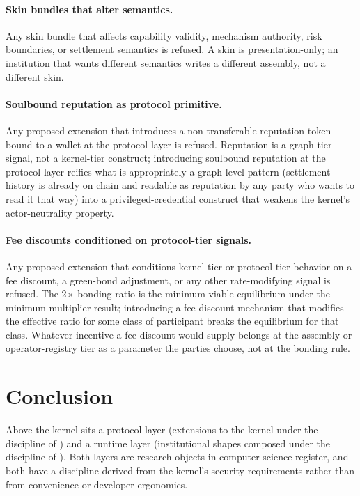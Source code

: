 \documentclass[11pt,a4paper]{article}
\theoremstyle{definition}
\theoremstyle{remark}
\begin{document}
\paragraph{Skin bundles that alter semantics.}
Any skin bundle that affects capability validity, mechanism
authority, risk boundaries, or settlement semantics is refused. A
skin is presentation-only; an institution that wants different
semantics writes a different assembly, not a different skin.

\paragraph{Soulbound reputation as protocol primitive.}
Any proposed extension that introduces a non-transferable
reputation token bound to a wallet at the protocol layer is
refused. Reputation is a graph-tier signal, not a kernel-tier
construct; introducing soulbound reputation at the protocol layer
reifies what is appropriately a graph-level pattern (settlement
history is already on chain and readable as reputation by any party
who wants to read it that way) into a privileged-credential
construct that weakens the kernel's actor-neutrality property.

\paragraph{Fee discounts conditioned on protocol-tier signals.}
Any proposed extension that conditions kernel-tier or
protocol-tier behavior on a fee discount, a green-bond
adjustment, or any other rate-modifying signal is refused. The
2$\times$ bonding ratio is the minimum viable equilibrium under
the minimum-multiplier result; introducing a fee-discount
mechanism that modifies the effective ratio for some class of
participant breaks the equilibrium for that class. Whatever
incentive a fee discount would supply belongs at the assembly
or operator-registry tier as a parameter the parties choose,
not at the bonding rule.

\section{Conclusion}
\label{sec:conclusion}

Above the kernel sits a protocol layer (extensions to the kernel
under the discipline of )
and a runtime layer (institutional shapes composed under the
discipline of ). Both layers are research objects
in computer-science register, and both have a discipline derived
from the kernel's security requirements rather than from convenience
or developer ergonomics.
\end{document}
